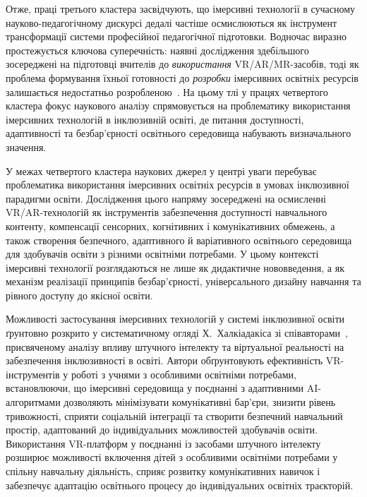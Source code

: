 Отже, праці третього кластера засвідчують, що імерсивні технології в сучасному науково-педагогічному дискурсі дедалі частіше осмислюються як інструмент трансформації системи професійної педагогічної підготовки. Водночас виразно простежується ключова суперечність: наявні дослідження здебільшого зосереджені на підготовці вчителів до \emph{використання} VR/AR/MR-засобів, тоді як проблема формування їхньої готовності до \emph{розробки} імерсивних освітніх ресурсів залишається недостатньо розробленою~\cite{BeldaMedina2022TPACK, Oberdorfer2021Interdisciplinary}. На цьому тлі у працях четвертого кластера фокус наукового аналізу спрямовується на проблематику використання імерсивних технологій в інклюзивній освіті, де питання доступності, адаптивності та безбар'єрності освітнього середовища набувають визначального значення.


У межах четвертого кластера наукових джерел у центрі уваги перебуває проблематика використання імерсивних освітніх ресурсів в умовах інклюзивної парадигми освіти. Дослідження цього напряму зосереджені на осмисленні VR/AR-технологій як інструментів забезпечення доступності навчального контенту, компенсації сенсорних, когнітивних і комунікативних обмежень, а також створення безпечного, адаптивного й варіативного освітнього середовища для здобувачів освіти з різними освітніми потребами. У цьому контексті імерсивні технології розглядаються не лише як дидактичне нововведення, а як механізм реалізації принципів безбар'єрності, універсального дизайну навчання та рівного доступу до якісної освіти.

Можливості застосування імерсивних технологій у системі інклюзивної освіти ґрунтовно розкрито у систематичному огляді Х.~Халкіадакіса зі співавторами~\cite{Chyhryna2023Inclusive}, присвяченому аналізу впливу штучного інтелекту та віртуальної реальності на забезпечення інклюзивності в освіті. Автори обґрунтовують ефективність VR-інструментів у роботі з учнями з особливими освітніми потребами, встановлюючи, що імерсивні середовища у поєднанні з адаптивними AI-алгоритмами дозволяють мінімізувати комунікативні бар'єри, знизити рівень тривожності, сприяти соціальній інтеграції та створити безпечний навчальний простір, адаптований до індивідуальних можливостей здобувачів освіти. Використання VR-платформ у поєднанні із засобами штучного інтелекту розширює можливості включення дітей з особливими освітніми потребами у спільну навчальну діяльність, сприяє розвитку комунікативних навичок і забезпечує адаптацію освітнього процесу до індивідуальних освітніх траєкторій.

